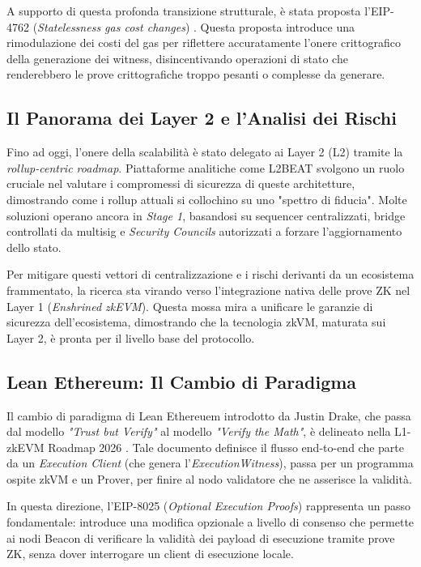 \documentclass[12pt,a4paper,openright,twoside]{report}
\begin{document}
A supporto di questa profonda transizione strutturale, è stata proposta l'EIP-4762 (\textit{Statelessness gas cost changes}) \cite{eip4762}. Questa proposta introduce una rimodulazione dei costi del gas per riflettere accuratamente l'onere crittografico della generazione dei witness, disincentivando operazioni di stato che renderebbero le prove crittografiche troppo pesanti o complesse da generare.

\subsection{Il Panorama dei Layer 2 e l'Analisi dei Rischi}

Fino ad oggi, l'onere della scalabilità è stato delegato ai Layer 2 (L2) tramite la \textit{rollup-centric roadmap}. Piattaforme analitiche come L2BEAT \cite{l2beat} svolgono un ruolo cruciale nel valutare i compromessi di sicurezza di queste architetture, dimostrando come i rollup attuali si collochino su uno "spettro di fiducia". Molte soluzioni operano ancora in \textit{Stage 1}, basandosi su sequencer centralizzati, bridge controllati da multisig e \textit{Security Councils} autorizzati a forzare l'aggiornamento dello stato. 

Per mitigare questi vettori di centralizzazione e i rischi derivanti da un ecosistema frammentato, la ricerca sta virando verso l'integrazione nativa delle prove ZK nel Layer 1 (\textit{Enshrined zkEVM}). Questa mossa mira a unificare le garanzie di sicurezza dell'ecosistema, dimostrando che la tecnologia zkVM, maturata sui Layer 2, è pronta per il livello base del protocollo.

\subsection{Lean Ethereum: Il Cambio di Paradigma}

Il cambio di paradigma di Lean Ethereuem introdotto da Justin Drake, che passa dal modello \textit{"Trust but Verify"} al modello \textit{"Verify the Math"}, è delineato nella L1-zkEVM Roadmap 2026 \cite{l1_zkevm_roadmap}. Tale documento definisce il flusso end-to-end che parte da un \textit{Execution Client} (che genera l'\textit{ExecutionWitness}), passa per un programma ospite zkVM e un Prover, per finire al nodo validatore che ne asserisce la validità.

In questa direzione, l'EIP-8025 (\textit{Optional Execution Proofs}) \cite{eip8025} rappresenta un passo fondamentale: introduce una modifica opzionale a livello di consenso che permette ai nodi Beacon di verificare la validità dei payload di esecuzione tramite prove ZK, senza dover interrogare un client di esecuzione locale.
\end{document}
